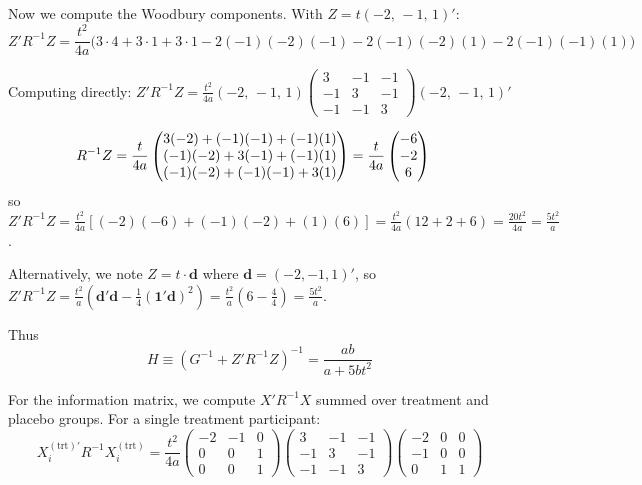 \documentclass[
  11pt,
]{article}
\begin{document}
Now we compute the Woodbury components. With
\(Z = t(-2,\, -1,\, 1)'\):
\begin{equation}
  Z'R^{-1}Z = \frac{t^2}{4a}\bigl(
    3 \cdot 4 + 3 \cdot 1 + 3 \cdot 1
    - 2(-1)(-2)(-1) - 2(-1)(-2)(1)
    - 2(-1)(-1)(1)\bigr)
\end{equation}

Computing directly:
\(Z'R^{-1}Z = \frac{t^2}{4a}(-2,\,-1,\,1)
\begin{pmatrix} 3&-1&-1 \\ -1&3&-1 \\ -1&-1&3
\end{pmatrix}
(-2,\,-1,\,1)'\)

\begin{align}
  R^{-1}Z &= \frac{t}{4a}\begin{pmatrix}
    3(-2)+(-1)(-1)+(-1)(1) \\
    (-1)(-2)+3(-1)+(-1)(1) \\
    (-1)(-2)+(-1)(-1)+3(1)
  \end{pmatrix}
  = \frac{t}{4a}\begin{pmatrix}
    -6 \\ -2 \\ 6
  \end{pmatrix}
  \notag
\end{align}
so \(Z'R^{-1}Z = \frac{t^2}{4a}
[(-2)(-6)+(-1)(-2)+(1)(6)] = \frac{t^2}{4a}(12+2+6)
= \frac{20t^2}{4a} = \frac{5t^2}{a}\).

Alternatively, we note \(Z = t \cdot \mathbf{d}\) where
\(\mathbf{d} = (-2,-1,1)'\), so \(Z'R^{-1}Z =
\frac{t^2}{a}(\mathbf{d}'\mathbf{d} -
\frac{1}{4}(\mathbf{1}'\mathbf{d})^2) =
\frac{t^2}{a}(6 - \frac{4}{4}) = \frac{5t^2}{a}\).

Thus
\begin{equation}
  H \equiv (G^{-1}+Z'R^{-1}Z)^{-1}
  = \frac{ab}{a + 5bt^2}
\end{equation}

For the information matrix, we compute
\(X'R^{-1}X\) summed over treatment and placebo groups.
For a single treatment participant:
\[
  X_i^{(\text{trt})\prime} R^{-1} X_i^{(\text{trt})}
  = \frac{t^2}{4a}\begin{pmatrix}
    -2 & -1 & 0 \\ 0 & 0 & 1 \\ 0 & 0 & 1
  \end{pmatrix}
  \begin{pmatrix}
    3&-1&-1\\-1&3&-1\\-1&-1&3
  \end{pmatrix}
  \begin{pmatrix}
    -2&0&0\\-1&0&0\\0&1&1
  \end{pmatrix}
\]
\end{document}
